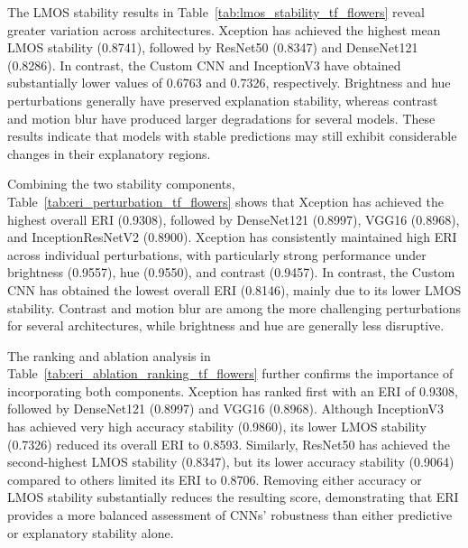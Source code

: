 \documentclass[a4paper,fleqn]{cas-dc}
\begin{document}
The LMOS stability results in Table~\ref{tab:lmos_stability_tf_flowers} reveal greater variation across architectures. Xception has achieved the highest mean LMOS stability (0.8741), followed by ResNet50 (0.8347) and DenseNet121 (0.8286). In contrast, the Custom CNN and InceptionV3 have obtained substantially lower values of 0.6763 and 0.7326, respectively. Brightness and hue perturbations generally have preserved explanation stability, whereas contrast and motion blur have produced larger degradations for several models. These results indicate that models with stable predictions may still exhibit considerable changes in their explanatory regions.

Combining the two stability components, Table~\ref{tab:eri_perturbation_tf_flowers} shows that Xception has achieved the highest overall ERI (0.9308), followed by DenseNet121 (0.8997), VGG16 (0.8968), and InceptionResNetV2 (0.8900). Xception has consistently maintained high ERI across individual perturbations, with particularly strong performance under brightness (0.9557), hue (0.9550), and contrast (0.9457). In contrast, the Custom CNN has obtained the lowest overall ERI (0.8146), mainly due to its lower LMOS stability. Contrast and motion blur are among the more challenging perturbations for several architectures, while brightness and hue are generally less disruptive.

The ranking and ablation analysis in Table~\ref{tab:eri_ablation_ranking_tf_flowers} further confirms the importance of incorporating both components. Xception has ranked first with an ERI of 0.9308, followed by DenseNet121 (0.8997) and VGG16 (0.8968). Although InceptionV3 has achieved very high accuracy stability (0.9860), its lower LMOS stability (0.7326) reduced its overall ERI to 0.8593. Similarly, ResNet50 has achieved the second-highest LMOS stability (0.8347), but its lower accuracy stability (0.9064) compared to others limited its ERI to 0.8706. Removing either accuracy or LMOS stability substantially reduces the resulting score, demonstrating that ERI provides a more balanced assessment of CNNs' robustness than either predictive or explanatory stability alone.
\end{document}
